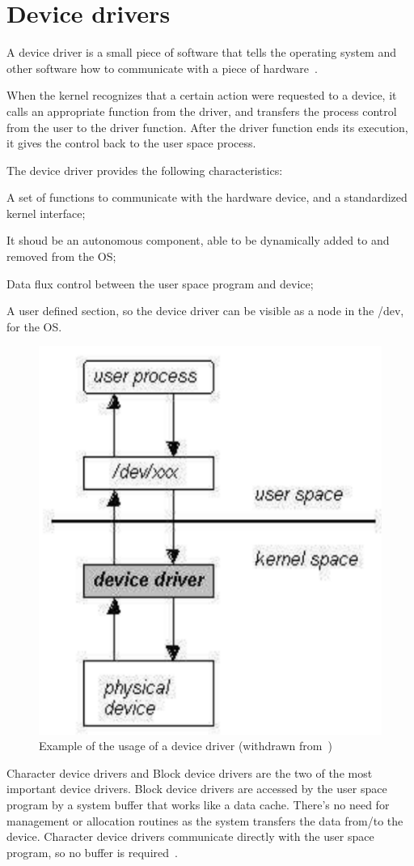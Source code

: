 %
\section{Device drivers}
\label{sec:device-drivers}

A device driver is a small piece of software that tells the operating system and other software how to communicate with a piece of hardware~\cite{ddrivers}.

When the kernel recognizes that a certain action were requested to a device, it calls an appropriate function from the driver, and transfers the process control from the user to the driver function.
After the driver function ends its execution, it gives the
control back to the user space process.

The device driver provides the following characteristics:
\begin{enum-c}[label=\roman*.]
\item A set of functions to communicate with the hardware
device, and a standardized kernel interface; 
\item It shoud be an autonomous component, able to be
dynamically added to and removed from the OS;
\item Data flux control between the user space program and
device;
\item A user defined section, so the device driver can be
visible as a node in the /dev, for the OS.
\end{enum-c}

\begin{figure}[htb!]
\centering
    \includegraphics[width=0.35\columnwidth]{./img/ddrivers-char.png}
  \caption{Example of the usage of a device driver (withdrawn from~\cite{ddrivers-slides})}%
\label{fig:ddrivers-char}
\end{figure}

Character device drivers and Block device drivers are the two of the most important device drivers.
Block device drivers are accessed by the user space program by a system buffer that works like a data cache. There's no need for management or allocation routines as the system transfers the data from/to the device.
Character device drivers communicate directly with the user space program, so no buffer is required~\cite{ddrivers-slides}.


